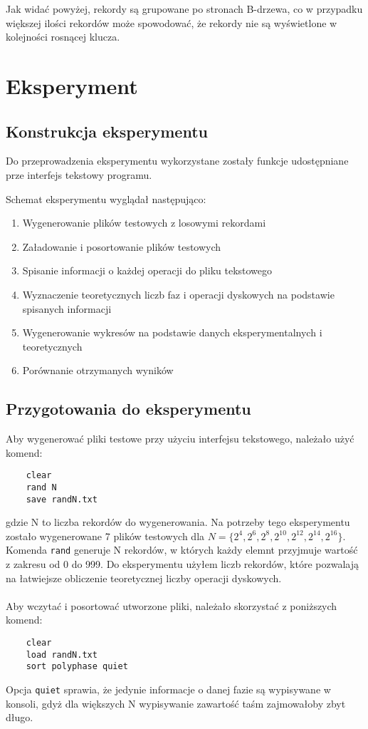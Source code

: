 \documentclass[12pt]{article}
\begin{document}
Jak widać powyżej, rekordy są grupowane po stronach B-drzewa, co w przypadku większej ilości rekordów może spowodować,
że rekordy nie są wyświetlone w kolejności rosnącej klucza.

\section{Eksperyment}
\subsection{Konstrukcja eksperymentu}
Do przeprowadzenia eksperymentu wykorzystane zostały funkcje udostępniane prze interfejs
tekstowy programu.

Schemat eksperymentu wyglądał następująco:

\begin{enumerate}
    \item Wygenerowanie plików testowych z losowymi rekordami
    \item Załadowanie i posortowanie plików testowych
    \item Spisanie informacji o każdej operacji do pliku tekstowego
    \item Wyznaczenie teoretycznych liczb faz i operacji dyskowych na podstawie spisanych informacji
    \item Wygenerowanie wykresów na podstawie danych eksperymentalnych i teoretycznych
    \item Porównanie otrzymanych wyników
\end{enumerate}

\subsection{Przygotowania do eksperymentu}
Aby wygenerować pliki testowe przy użyciu interfejsu tekstowego, należało użyć komend: 
\begin{verbatim}
    clear
    rand N
    save randN.txt
\end{verbatim}
gdzie N to liczba rekordów do wygenerowania. Na potrzeby tego eksperymentu zostało
wygenerowane 7 plików testowych dla \(N = \{2^4, 2^6, 2^8, 2^{10}, 2^{12}, 2^{14}, 2^{16}\}\).
Komenda \verb|rand| generuje N rekordów, w których każdy elemnt przyjmuje wartość z zakresu od 0 do 999. 
Do eksperymentu użyłem liczb rekordów, które pozwalają na łatwiejsze obliczenie teoretycznej liczby
operacji dyskowych.
\\ \\
Aby wczytać i posortować utworzone pliki, należało skorzystać z poniższych komend:
\begin{verbatim}
    clear
    load randN.txt
    sort polyphase quiet
\end{verbatim}
Opcja \verb|quiet| sprawia, że jedynie informacje o danej fazie są wypisywane w konsoli, gdyż
dla większych N wypisywanie zawartość taśm zajmowałoby zbyt długo.
\end{document}
